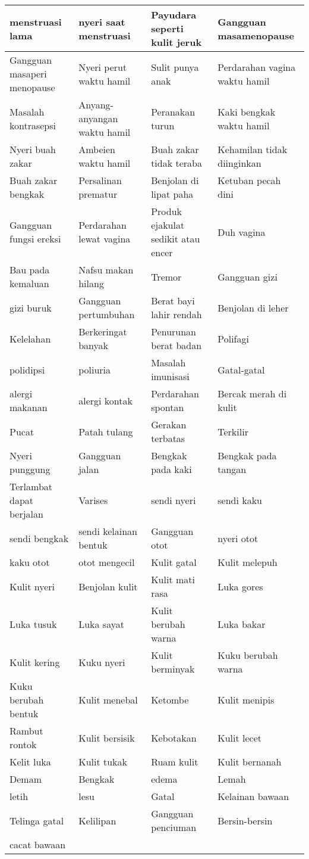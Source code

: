 \begin{longtable}{|p{}|p{}|p{}|p{}|}
	menstruasi lama & nyeri saat menstruasi & Payudara seperti kulit jeruk & Gangguan masamenopause \\ \hline
	Gangguan masaperi menopause & Nyeri perut waktu hamil & Sulit punya anak & Perdarahan vagina waktu hamil \\ \hline
	Masalah kontrasepsi & Anyang-anyangan waktu hamil & Peranakan turun & Kaki bengkak waktu hamil \\ \hline
	Nyeri buah zakar & Ambeien waktu hamil & Buah zakar tidak teraba & Kehamilan tidak diinginkan \\ \hline
	Buah zakar bengkak & Persalinan prematur & Benjolan di lipat paha & Ketuban pecah dini \\ \hline
	Gangguan fungsi ereksi & Perdarahan lewat vagina & Produk ejakulat sedikit atau encer & Duh vagina \\ \hline
	Bau pada kemaluan & Nafsu makan hilang & Tremor & Gangguan gizi \\ \hline
	gizi buruk & Gangguan pertumbuhan & Berat bayi lahir rendah & Benjolan di leher \\ \hline
	Kelelahan & Berkeringat banyak & Penurunan berat badan & Polifagi \\ \hline
	polidipsi & poliuria & Masalah imunisasi & Gatal-gatal \\ \hline
	alergi makanan & alergi kontak & Perdarahan spontan & Bercak merah di kulit \\ \hline
	Pucat & Patah tulang & Gerakan terbatas & Terkilir \\ \hline
	Nyeri punggung & Gangguan jalan & Bengkak pada kaki & Bengkak pada tangan \\ \hline
	Terlambat dapat berjalan & Varises & sendi nyeri & sendi kaku \\ \hline
	sendi bengkak & sendi kelainan bentuk & Gangguan otot & nyeri otot \\ \hline
	kaku otot & otot mengecil & Kulit gatal & Kulit melepuh \\ \hline
	Kulit nyeri & Benjolan kulit & Kulit mati rasa & Luka gores \\ \hline
	Luka tusuk & Luka sayat & Kulit berubah warna & Luka bakar \\ \hline
	Kulit kering & Kuku nyeri & Kulit berminyak & Kuku berubah warna \\ \hline
	Kuku berubah bentuk & Kulit menebal & Ketombe & Kulit menipis \\ \hline
	Rambut rontok & Kulit bersisik & Kebotakan & Kulit lecet \\ \hline
	Kelit luka & Kulit tukak & Ruam kulit & Kulit bernanah \\ \hline
	Demam & Bengkak & edema & Lemah \\ \hline
	letih & lesu & Gatal & Kelainan bawaan \\ \hline
	Telinga gatal & Kelilipan & Gangguan penciuman & Bersin-bersin \\ \hline
	cacat bawaan &  &  &  \\ \hline
\end{longtable}